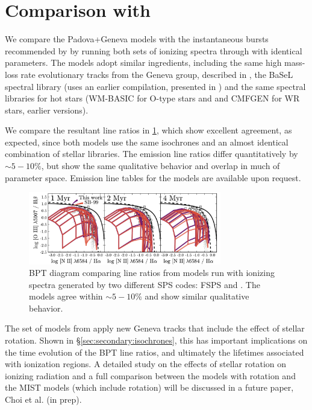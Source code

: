\appendix

\section{Comparison with \SB}\label{appendix:SB}

We compare the Padova+Geneva models with the \SB{} instantaneous bursts recommended by \citet{Levesque10} by running both sets of ionizing spectra through \Cloudy with identical parameters. The \SB{} models adopt similar ingredients, including the same high mass-loss rate evolutionary tracks from the Geneva group, described in \citet{Meynet00}, the BaSeL spectral library (\SB uses an earlier compilation, presented in \citet{Lejeune}) and the same spectral libraries for hot stars (WM-BASIC for O-type stars and and CMFGEN for WR stars, earlier versions).

We compare the resultant line ratios in \ref{fig:BPTsb99}, which show excellent agreement, as expected, since both models use the same isochrones and an almost identical combination of stellar libraries. The emission line ratios differ quantitatively by $\sim5-10\%$, but show the same qualitative behavior and overlap in much of parameter space. Emission line tables for the \SB models are available upon request.

\begin{figure}
  \begin{centering}
    \includegraphics[width=0.75\textwidth]{manuscript/chapter2/f32.pdf}
    \caption{BPT diagram comparing line ratios from \Cloudy models run with ionizing spectra generated by two different SPS codes: FSPS and \SB. The models agree within $\sim5-10\%$ and show similar qualitative behavior.}
    \label{fig:BPTsb99}
  \end{centering}
\end{figure}

The set of \SB models from \citet{Levesque14} apply new Geneva tracks that include the effect of stellar rotation. Shown in \S\ref{sec:secondary:isochrones}, this has important implications on the time evolution of the BPT line ratios, and ultimately the lifetimes associated with ionization regions. A detailed study on the effects of stellar rotation on ionizing radiation and a full comparison between the \SB models with rotation and the MIST models (which include rotation) will be discussed in a future paper, Choi et al. (in prep).

